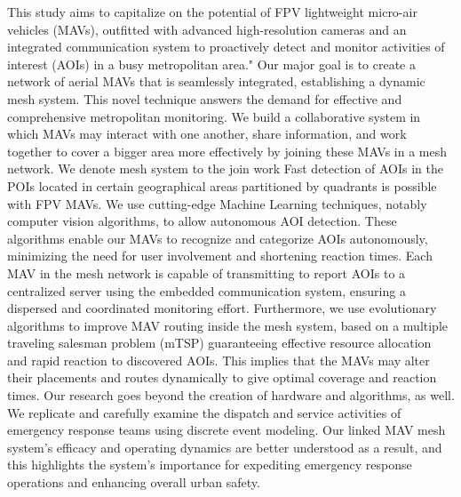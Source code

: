 \documentclass[preprint,review, 11pt,3p,authoryear]{elsarticle}
\newcommand{\rev}{\color{black}} %
\begin{document}
This study aims to capitalize on the potential of FPV lightweight micro-air vehicles (MAVs),  outfitted with advanced high-resolution cameras and an integrated communication system to proactively detect and monitor activities of interest (AOIs) in a busy metropolitan area." Our major goal is to create a network of aerial MAVs that is seamlessly integrated, establishing a dynamic mesh system. This novel technique answers the demand for effective and comprehensive metropolitan monitoring. We build a collaborative system in which MAVs may interact with one another, share information, and work together to cover a bigger area more effectively by joining these MAVs in a mesh network. We denote mesh system to the join work 
Fast detection of AOIs in the POIs located in certain geographical areas partitioned by quadrants is possible with FPV MAVs. We use cutting-edge Machine Learning techniques, notably computer vision algorithms, to allow autonomous AOI detection. These algorithms enable our MAVs to recognize and categorize AOIs autonomously, minimizing the need for user involvement and shortening reaction times. Each MAV in the mesh network is capable of transmitting to report AOIs to a centralized server using the embedded communication system, ensuring a dispersed and coordinated monitoring effort. Furthermore, we use evolutionary algorithms to improve MAV routing inside the mesh system, based on a multiple traveling salesman problem (mTSP) guaranteeing effective resource allocation and rapid reaction to discovered AOIs. This implies that the MAVs may alter their placements and routes dynamically to give optimal coverage and reaction times. Our research goes beyond the creation of hardware and algorithms, as well. We replicate and carefully examine the dispatch and service activities of emergency response teams using discrete event modeling. Our linked MAV mesh system's efficacy and operating dynamics are better understood as a result, and this highlights the system's importance for expediting emergency response operations and enhancing overall urban safety.



\end{document}
